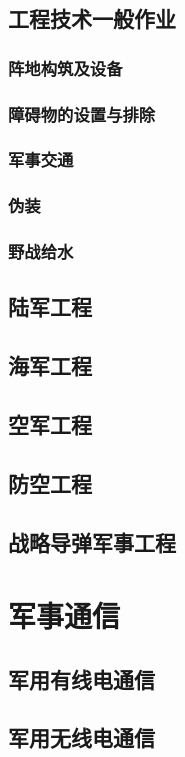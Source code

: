 \documentclass[UTF8]{../ApplicationUniverse}
\begin{document}
    \subsection{工程技术一般作业}
        \subsubsection{阵地构筑及设备}
        \subsubsection{障碍物的设置与排除}
        \subsubsection{军事交通}
        \subsubsection{伪装}
        \subsubsection{野战给水}
    \subsection{陆军工程}
    \subsection{海军工程}
    \subsection{空军工程}
    \subsection{防空工程}
    \subsection{战略导弹军事工程}
\section{军事通信}
    \subsection{军用有线电通信}
    \subsection{军用无线电通信}
\end{document}
